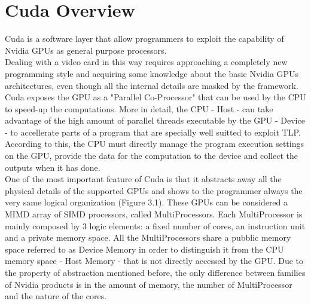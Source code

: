 \chapter{Cuda Overview}\label{sec:i}
Cuda is a software layer that allow programmers to exploit the capability of Nvidia GPUs as general purpose processors.\\
Dealing with a video card in this way requires approaching a completely new programming style and acquiring some knowledge about the basic Nvidia GPUs architectures, even though all the internal details are masked by the framework.\\
Cuda exposes the GPU as a "Parallel Co-Processor" that can be used by the CPU to speed-up the computations. More in detail, the CPU - Host - can take advantage of the high amount of parallel threads executable by the GPU - Device - to accellerate parts of a program that are specially well suitted to exploit TLP. According to this, the CPU must directly manage the program execution settings on the GPU, provide the data for the computation to the device and collect the outputs when it has done.\\
One of the most important feature of Cuda is that it abstracts away all the physical details of the supported GPUs and shows to the programmer always the very same logical organization (Figure 3.1). These GPUs can be considered a MIMD array of SIMD processors, called MultiProcessors. Each MultiProcessor is mainly composed by 3 logic elements: a fixed number of cores, an instruction unit and a private memory space. All the MultiProcessors share a pubblic memory space referred to as Device Memory in order to distinguish it from the CPU memory space - Host Memory - that is not directly accessed by the GPU. Due to the property of abstraction mentioned before, the only difference between families of Nvidia products is in the amount of memory, the number of MultiProcessor and the nature of the cores.\\


